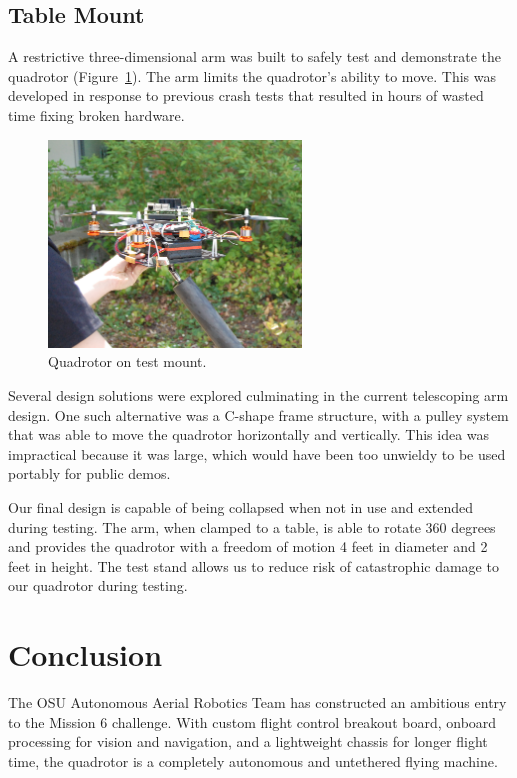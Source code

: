 \documentclass[12pt,letterpaper]{article} \usepackage[margin=1in]{geometry}
\begin{document}
\subsection*{Table Mount}

A restrictive three-dimensional arm was built to safely test and demonstrate
the quadrotor (Figure~\ref{fig:quad_test_mount}). The arm limits the
quadrotor's ability to move. This was developed in response to previous crash
tests that resulted in hours of wasted time fixing broken hardware.

\begin{figure}[!h]
	\centering
	\includegraphics[width=0.6\textwidth]{img/quad_test_mount.jpg}
	\caption{Quadrotor on test mount.}
	\label{fig:quad_test_mount}
\end{figure}

Several design solutions were explored culminating in the current telescoping
arm design. One such alternative was a C-shape frame structure, with a pulley
system that was able to move the quadrotor horizontally and vertically. This
idea was impractical because it was large, which would have been too unwieldy
to be used portably for public demos.

Our final design is capable of being collapsed when not in use and extended
during testing. The arm, when clamped to a table, is able to rotate 360 degrees
and provides the quadrotor with a freedom of motion 4 feet in diameter and
2 feet in height. The test stand allows us to reduce risk of catastrophic
damage to our quadrotor during testing.



\section*{Conclusion}

The OSU Autonomous Aerial Robotics Team has constructed an ambitious entry to
the Mission 6 challenge. With custom flight control breakout board, onboard
processing for vision and navigation, and a lightweight chassis for longer
flight time, the quadrotor is a completely autonomous and untethered flying
machine.
\end{document}
